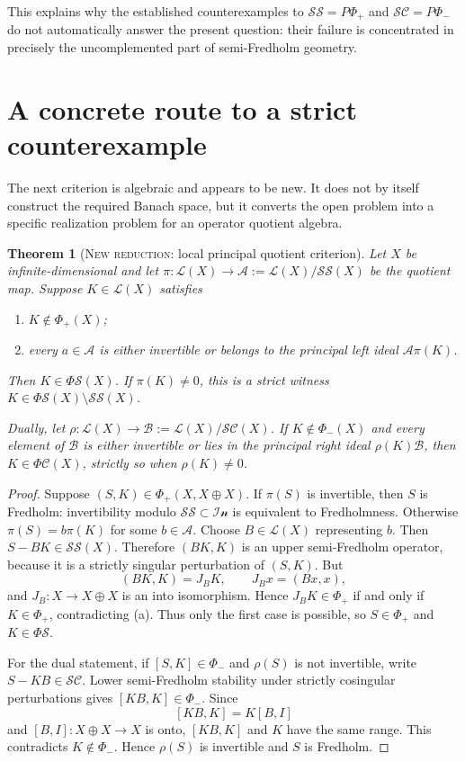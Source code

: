 \documentclass[11pt]{article}
\newtheorem{theorem}{Theorem}[section]
\theoremstyle{definition}
\newcommand{\Lop}{\mathcal L}
\newcommand{\SSing}{\mathcal{SS}}
\newcommand{\SCos}{\mathcal{SC}}
\newcommand{\Iness}{\mathcal{In}}
\newcommand{\PhiS}{\Phi\mathcal S}
\newcommand{\PhiC}{\Phi\mathcal C}
\newcommand{\PhiP}{\Phi_+}
\newcommand{\PhiM}{\Phi_-}
\newcommand{\PPhiP}{P\Phi_+}
\newcommand{\PPhiM}{P\Phi_-}
\newcommand{\newresult}{\textcolor{newblue}{\textsc{New reduction}}}
\begin{document}
This explains why the established counterexamples to
\(\SSing=\PPhiP\) and \(\SCos=\PPhiM\) do not automatically answer the present
question: their failure is concentrated in precisely the uncomplemented part of
semi-Fredholm geometry.

\section{A concrete route to a strict counterexample}

The next criterion is algebraic and appears to be new.  It does not by itself construct the
required Banach space, but it converts the open problem into a specific realization
problem for an operator quotient algebra.

\begin{theorem}[\newresult: local principal quotient criterion]\label{thm:local}
Let \(X\) be infinite-dimensional and let
\(\pi\colon\Lop(X)\to\mathcal A:=\Lop(X)/\SSing(X)\) be the quotient map.  Suppose
\(K\in\Lop(X)\) satisfies
\begin{enumerate}[label=\rm(\alph*)]
\item \(K\notin\PhiP(X)\);
\item every \(a\in\mathcal A\) is either invertible or belongs to the principal left ideal
\(\mathcal A\pi(K)\).
\end{enumerate}
Then \(K\in\PhiS(X)\).  If \(\pi(K)\ne0\), this is a strict witness
\(K\in\PhiS(X)\setminus\SSing(X)\).

Dually, let \(\rho\colon\Lop(X)\to\mathcal B:=\Lop(X)/\SCos(X)\).  If
\(K\notin\PhiM(X)\) and every element of \(\mathcal B\) is either invertible or lies in
the principal right ideal \(\rho(K)\mathcal B\), then
\(K\in\PhiC(X)\), strictly so when \(\rho(K)\ne0\).
\end{theorem}

\begin{proof}
Suppose \((S,K)\in\PhiP(X,X\oplus X)\).  If \(\pi(S)\) is invertible, then \(S\) is
Fredholm: invertibility modulo \(\SSing\subset\Iness\) is equivalent to Fredholmness.
Otherwise \(\pi(S)=b\pi(K)\) for some \(b\in\mathcal A\).  Choose
\(B\in\Lop(X)\) representing \(b\).  Then \(S-BK\in\SSing(X)\).  Therefore
\((BK,K)\) is an upper semi-Fredholm operator, because it is a strictly singular
perturbation of \((S,K)\).  But
\[
 (BK,K)=J_BK,\qquad J_Bx=(Bx,x),
\]
and \(J_B\colon X\to X\oplus X\) is an into isomorphism.  Hence \(J_BK\in\PhiP\)
if and only if \(K\in\PhiP\), contradicting (a).  Thus only the first case is possible,
so \(S\in\PhiP\) and \(K\in\PhiS\).

For the dual statement, if \([S,K]\in\PhiM\) and \(\rho(S)\) is not invertible, write
\(S-KB\in\SCos\).  Lower semi-Fredholm stability under strictly cosingular
perturbations gives \([KB,K]\in\PhiM\).  Since
\[
 [KB,K]=K[B,I]
\]
and \([B,I]\colon X\oplus X\to X\) is onto, \([KB,K]\) and \(K\) have the same
range.  This contradicts \(K\notin\PhiM\).  Hence \(\rho(S)\) is invertible and \(S\)
is Fredholm.
\end{proof}
\end{document}

